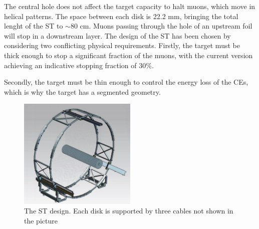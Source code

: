 The central hole does not affect the target capacity to halt muons, 
which move in helical patterns. The space between each disk is
22.2 mm, bringing the total lenght of the ST to $\sim$80 cm.
Muons passing through the hole of an upstream foil will stop in a downstream layer. 
The design of the ST has been chosen by considering two 
conflicting physical requirements. Firstly, the target must be thick enough 
to stop a significant fraction of the muons, with the current version achieving 
an indicative stopping fraction of 30\%.

Secondly, the target must be thin 
enough to control the energy loss of the CEs, which is why 
the target has a segmented geometry.
\begin{figure}[!h]
    \centering
    \includegraphics[width =0.5\textwidth]{figures/png/Screenshot_20240706_122723.png}
    \caption[The Stopping Target design.]{The ST design. 
    Each disk is supported by three cables not shown in the picture }
    \label{fig:ST}
\end{figure}

